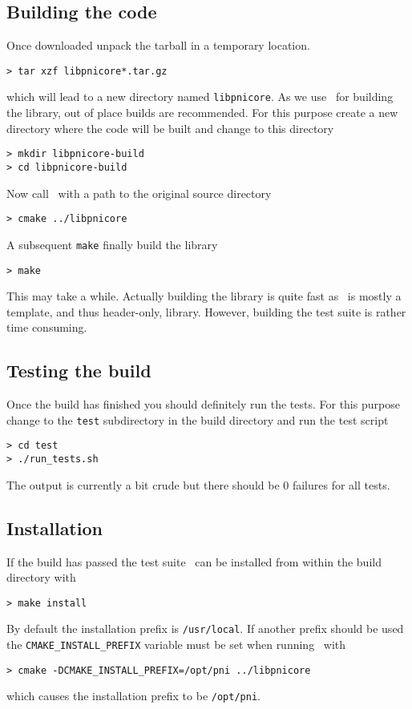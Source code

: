 \subsection{Building the code}

Once downloaded unpack the tarball in a temporary location.
\begin{verbatim}
> tar xzf libpnicore*.tar.gz
\end{verbatim}
which will lead to a new directory named \texttt{libpnicore}. As we use \cmake\ for
building the library, out of place builds are recommended. For this purpose
create a new directory where the code will be built and change to this directory
\begin{verbatim}
> mkdir libpnicore-build
> cd libpnicore-build
\end{verbatim}
Now call \cmake\ with a path to the original source directory
\begin{verbatim}
> cmake ../libpnicore
\end{verbatim}
A subsequent \texttt{make} finally build the library
\begin{verbatim}
> make
\end{verbatim}
This may take a while. Actually building the library is quite fast as
\libpnicore\ is mostly a template, and thus header-only, library.
However, building the test suite is rather time consuming.

\subsection{Testing the build}

Once the build has finished you should definitely run the tests. For this
purpose change to the \texttt{test} subdirectory in the build directory and run
the test script
\begin{verbatim}
> cd test
> ./run_tests.sh
\end{verbatim}
The output is currently a bit crude but there should be $0$ failures for all
tests.

\subsection{Installation}

If the build has passed the test suite \libpnicore\ can be installed from within
the build directory with
\begin{verbatim}
> make install
\end{verbatim}
By default the installation prefix is \texttt{/usr/local}. If another prefix should
be used the \texttt{CMAKE\_INSTALL\_PREFIX} variable must be set when running
\cmake\ with
\begin{verbatim}
> cmake -DCMAKE_INSTALL_PREFIX=/opt/pni ../libpnicore
\end{verbatim}
which causes the installation prefix to be \texttt{/opt/pni}.
